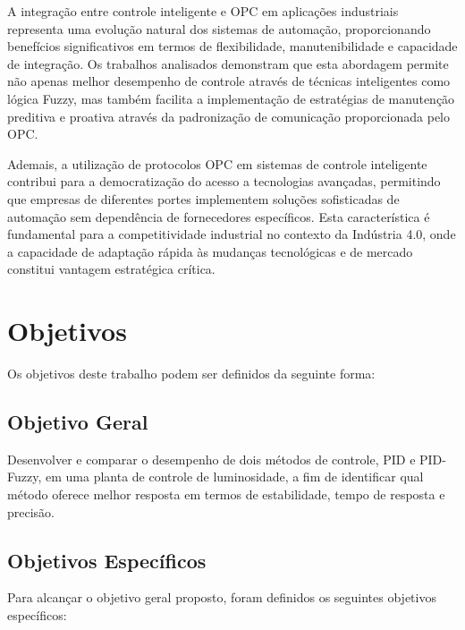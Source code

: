 A integração entre controle inteligente e OPC em aplicações industriais representa uma evolução natural dos sistemas de automação, proporcionando benefícios significativos em termos de flexibilidade, manutenibilidade e capacidade de integração. Os trabalhos analisados demonstram que esta abordagem permite não apenas melhor desempenho de controle através de técnicas inteligentes como lógica Fuzzy, mas também facilita a implementação de estratégias de manutenção preditiva e proativa através da padronização de comunicação proporcionada pelo OPC.

Ademais, a utilização de protocolos OPC em sistemas de controle inteligente contribui para a democratização do acesso a tecnologias avançadas, permitindo que empresas de diferentes portes implementem soluções sofisticadas de automação sem dependência de fornecedores específicos. Esta característica é fundamental para a competitividade industrial no contexto da Indústria 4.0, onde a capacidade de adaptação rápida às mudanças tecnológicas e de mercado constitui vantagem estratégica crítica.

\section{Objetivos}
\label{sec:obj}
Os objetivos deste trabalho podem ser definidos da seguinte forma:

\subsection{Objetivo Geral}
\label{sec:objgeral}
Desenvolver e comparar o desempenho de dois métodos de controle, PID e PID-Fuzzy, em uma planta de controle de luminosidade, a fim de identificar qual método oferece melhor resposta em termos de estabilidade, tempo de resposta e precisão.

\subsection{Objetivos Específicos}
\label{sec:objespec}
Para alcançar o objetivo geral proposto, foram definidos os seguintes objetivos específicos:


